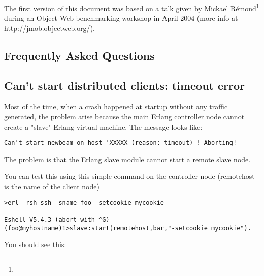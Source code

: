 \documentclass{TSUNG-en}
\begin{document}
The first version of this document was based on a talk given by Mickael
Rémond\footnote{} during an Object
Web benchmarking workshop in April 2004 (more info at
\url{http://jmob.objectweb.org/}).


\begin{appendix}

\section{Frequently Asked Questions}

\subsection{Can't start distributed clients: timeout error }

Most of the time, when a crash happened at startup without any traffic
generated, the problem arise because the main Erlang controller node cannot
create a "slave" Erlang virtual machine. The message looks like:

\begin{Verbatim}
Can't start newbeam on host 'XXXXX (reason: timeout) ! Aborting!
\end{Verbatim}


The problem is that the Erlang slave module cannot start a remote slave
node.

You can test this using this simple command on the controller node
(remotehost is the name of the client node)
\begin{Verbatim}
>erl -rsh ssh -sname foo -setcookie mycookie

Eshell V5.4.3 (abort with ^G)
(foo@myhostname)1>slave:start(remotehost,bar,"-setcookie mycookie").
\end{Verbatim}
You should see this: 


\end{appendix}
\end{document}
